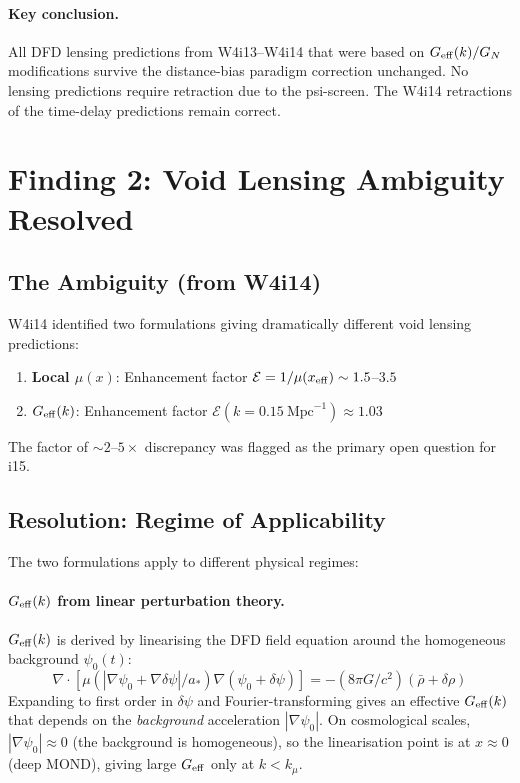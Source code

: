 \documentclass[11pt,a4paper]{article}
\newcommand{\Geff}{G_{\rm eff}}
\begin{document}
\paragraph{Key conclusion.}
All DFD lensing predictions from W4i13--W4i14 that were based on
$\Geff(k)/G_N$ modifications survive the distance-bias paradigm
correction unchanged.  No lensing predictions require retraction
due to the psi-screen.  The W4i14 retractions of the time-delay
predictions remain correct.


\section{Finding 2: Void Lensing Ambiguity Resolved}
\label{sec:void-resolution}

\subsection{The Ambiguity (from W4i14)}

W4i14 identified two formulations giving dramatically different
void lensing predictions:
\begin{enumerate}[label=(\alph*)]
\item \textbf{Local $\mu(x)$}: Enhancement factor $\mathcal{E} = 1/\mu(x_{\rm eff})
  \sim 1.5$--$3.5$
\item \textbf{$\Geff(k)$}: Enhancement factor $\mathcal{E}(k = 0.15~\text{Mpc}^{-1})
  \approx 1.03$
\end{enumerate}

The factor of $\sim 2$--$5\times$ discrepancy was flagged as the
primary open question for i15.

\subsection{Resolution: Regime of Applicability}

The two formulations apply to different physical regimes:

\paragraph{$\Geff(k)$ from linear perturbation theory.}
$\Geff(k)$ is derived by linearising the DFD field equation around the
homogeneous background $\psi_0(t)$:
\begin{equation}
\nabla\cdot[\mu(|\nabla\psi_0 + \nabla\delta\psi|/a_*)\nabla(\psi_0 + \delta\psi)]
= -(8\pi G/c^2)(\bar\rho + \delta\rho)
\end{equation}
Expanding to first order in $\delta\psi$ and Fourier-transforming gives
an effective $\Geff(k)$ that depends on the \emph{background} acceleration
$|\nabla\psi_0|$.  On cosmological scales, $|\nabla\psi_0| \approx 0$
(the background is homogeneous), so the linearisation point is at
$x \approx 0$ (deep MOND), giving large $\Geff$ only at $k < k_\mu$.
\end{document}
